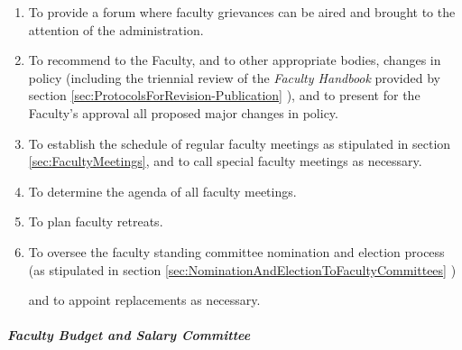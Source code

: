 \begin{enumerate}[label=\alph*)]
{\begin{enumerate}[label=\arabic*)]
								\item{To provide a forum where faculty grievances can be aired and brought to the attention of the administration.}
								\item{To recommend to the Faculty, and to other appropriate bodies, changes in policy (including the triennial review of the \emph{Faculty Handbook} provided by
									section
									\ref{sec:ProtocolsForRevision-Publication}
									), and to present for the Faculty's approval all proposed major changes in policy.}
								\item{To establish the schedule of regular faculty meetings as stipulated in
									section
									\ref{sec:FacultyMeetings}, and to call special faculty meetings as necessary.}
								\item{To determine the agenda of all faculty meetings.}
								\item{To plan faculty retreats.}
								\item{To oversee the faculty standing committee nomination and election process (as stipulated in
									section
									\ref{sec:NominationAndElectionToFacultyCommittees}
									)

									and to appoint replacements as necessary.}
							\end{enumerate}
						}
					\end{enumerate}
				\subparagraph{Faculty Budget and Salary Committee}
